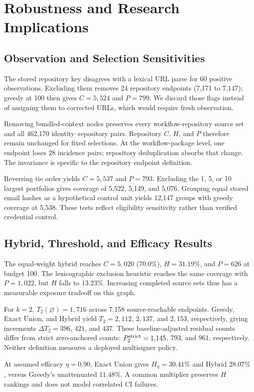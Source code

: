 \section{Robustness and Research Implications}
\subsection{Observation and Selection Sensitivities}
The stored repository key disagrees with a lexical URL parse for 60 positive observations. Excluding them removes 24 repository endpoints (7,171 to 7,147); greedy at 100 then gives $C=5{,}524$ and $P=799$. We discard those flags instead of assigning them to corrected URLs, which would require fresh observation.

Removing bundled-context nodes preserves every workflow-repository source set and all 462,170 identity--repository pairs. Repository $C$, $H$, and $P$ therefore remain unchanged for fixed selections. At the workflow-package level, one endpoint loses 28 incidence pairs; repository deduplication absorbs that change. The invariance is specific to the repository endpoint definition.

Reversing tie order yields $C=5{,}537$ and $P=793$. Excluding the 1, 5, or 10 largest portfolios gives coverage of 5,522, 5,149, and 5,076. Grouping equal stored email hashes as a hypothetical control unit yields 12,147 groups with greedy coverage at 5,538. These tests reflect eligibility sensitivity rather than verified credential control.

\subsection{Hybrid, Threshold, and Efficacy Results}
The equal-weight hybrid reaches $C=5{,}020$ (70.0\%), $H=31.19\%$, and $P=626$ at budget 100. The lexicographic exclusion heuristic reaches the same coverage with $P=1{,}022$, but $H$ falls to $13.23\%$. Increasing completed source sets thus has a measurable exposure tradeoff on this graph.

For $k=2$, $T_2(\varnothing)=1{,}716$ across 7,158 source-reachable endpoints. Greedy, Exact Union, and Hybrid yield $T_2=2{,}112$, $2{,}137$, and $2{,}153$, respectively, giving increments $\Delta T_2=396$, $421$, and $437$. These baseline-adjusted residual counts differ from strict zero-anchored counts: $P_2^{\rm strict}=1{,}145$, $793$, and $961$, respectively. Neither definition measures a deployed multisigner policy.

At assumed efficacy $\eta=0.90$, Exact Union gives $H_\eta=30.41\%$ and Hybrid $28.07\%$, versus Greedy's unattenuated $11.48\%$. A common multiplier preserves $H$ rankings and does not model correlated CI failures.

